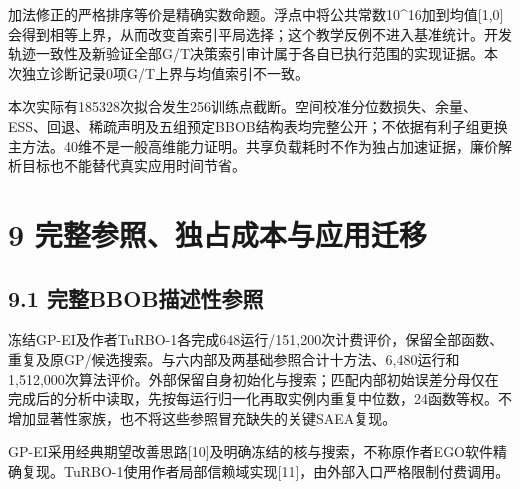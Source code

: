 \documentclass[11pt,a4paper]{article}
\begin{document}
加法修正的严格排序等价是精确实数命题。浮点中将公共常数10\^{}16加到均值{[}1,0{]}会得到相等上界，从而改变首索引平局选择；这个教学反例不进入基准统计。开发轨迹一致性及新验证全部G/T决策索引审计属于各自已执行范围的实现证据。本次独立诊断记录0项G/T上界与均值索引不一致。

本次实际有185328次拟合发生256训练点截断。空间校准分位数损失、余量、ESS、回退、稀疏声明及五组预定BBOB结构表均完整公开；不依据有利子组更换主方法。40维不是一般高维能力证明。共享负载耗时不作为独占加速证据，廉价解析目标也不能替代真实应用时间节省。

\hypertarget{ux5b8cux6574ux53c2ux7167ux72ecux5360ux6210ux672cux4e0eux5e94ux7528ux8fc1ux79fb}{%
\section{9
完整参照、独占成本与应用迁移}\label{ux5b8cux6574ux53c2ux7167ux72ecux5360ux6210ux672cux4e0eux5e94ux7528ux8fc1ux79fb}}

\hypertarget{ux5b8cux6574bbobux63cfux8ff0ux6027ux53c2ux7167}{%
\subsection{9.1
完整BBOB描述性参照}\label{ux5b8cux6574bbobux63cfux8ff0ux6027ux53c2ux7167}}

冻结GP-EI及作者TuRBO-1各完成648运行/151,200次计费评价，保留全部函数、重复及原GP/候选搜索。与六内部及两基础参照合计十方法、6,480运行和1,512,000次算法评价。外部保留自身初始化与搜索；匹配内部初始误差分母仅在完成后的分析中读取，先按每运行归一化再取实例内重复中位数，24函数等权。不增加显著性家族，也不将这些参照冒充缺失的关键SAEA复现。

GP-EI采用经典期望改善思路{[}10{]}及明确冻结的核与搜索，不称原作者EGO软件精确复现。TuRBO-1使用作者局部信赖域实现{[}11{]}，由外部入口严格限制付费调用。
\end{document}

